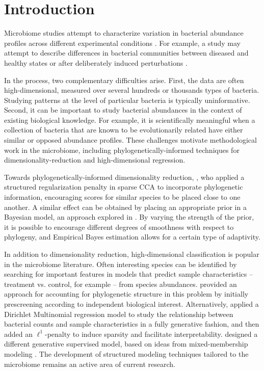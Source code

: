 \documentclass{article}
\begin{document}
\section{Introduction}

Microbiome studies attempt to characterize variation in bacterial abundance
profiles across different experimental conditions \citep{human2012structure,
  gilbert2014earth}. For example, a study may attempt to describe differences in
bacterial communities between diseased and healthy states or after deliberately
induced perturbations \citep{dethlefsen2011incomplete, fukuyama2017multidomain}.

In the process, two complementary difficulties arise. First, the data are often
high-dimensional, measured over several hundreds or thousands types of bacteria.
Studying patterns at the level of particular bacteria is typically
uninformative. Second, it can be important to study bacterial abundances in the
context of existing biological knowledge. For example, it is scientifically
meaningful when a collection of bacteria that are known to be evolutionarily
related have either similar or opposed abundance profiles. These challenges
motivate methodological work in the microbiome, including
phylogenetically-informed techniques for dimensionality-reduction and
high-dimensional regression.

Towards phylogenetically-informed dimensionality reduction,
\cite{chen2013structure}, who applied a structured regularization penalty in
sparse CCA to incorporate phylogenetic information, encouraging scores for
similar species to be placed close to one another. A similar effect can be
obtained by placing an appropriate prior in a Bayesian model, an approach
explored in \cite{fukuyama2017adaptive}. By varying the strength of the prior,
it is possible to encourage different degrees of smoothness with respect to
phylogeny, and Empirical Bayes estimation allows for a certain type of
adaptivity.

In addition to dimensionality reduction, high-dimensional classification is
popular in the microbiome literature. Often interesting species can be
identified by searching for important features in models that predict sample
characteristics -- treatment vs. control, for example -- from species
abundances. \cite{segata2011metagenomic} provided an approach for accounting for
phylogenetic structure in this problem by initially prescreening according to
independent biological interest. Alternatively, \cite{chen2013variable} applied
a Dirichlet Multinomial regression model to study the relationship between
bacterial counts and sample characteristics in a fully generative fashion, and
then added an $\ell^{1}$-penalty to induce sparsity and facilitate
interpretability. \cite{shafiei2015biomico} designed a different generative
supervised model, based on ideas from mixed-membership modeling
\citep{blei2003latent}. The development of structured modeling techniques
tailored to the microbiome remains an active area of current research.
\end{document}
